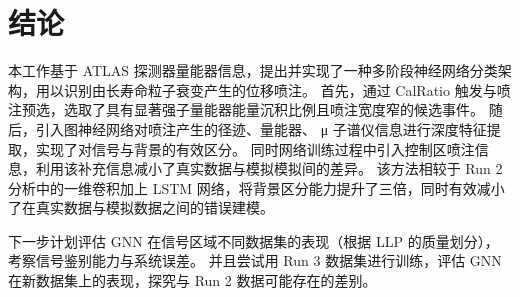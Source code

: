 
\chapter{结论}
本工作基于 ATLAS 探测器量能器信息，提出并实现了一种多阶段神经网络分类架构，用以识别由长寿命粒子衰变产生的位移喷注。
首先，通过 CalRatio 触发与喷注预选，选取了具有显著强子量能器能量沉积比例且喷注宽度窄的候选事件。
随后，引入图神经网络对喷注产生的径迹、量能器、 μ 子谱仪信息进行深度特征提取，实现了对信号与背景的有效区分。
同时网络训练过程中引入控制区喷注信息，利用该补充信息减小了真实数据与模拟模拟间的差异。
该方法相较于 Run 2 分析中的一维卷积加上 LSTM 网络，将背景区分能力提升了三倍，同时有效减小了在真实数据与模拟数据之间的错误建模。

下一步计划评估 GNN 在信号区域不同数据集的表现（根据 LLP 的质量划分），考察信号鉴别能力与系统误差。
并且尝试用 Run 3 数据集进行训练，评估 GNN 在新数据集上的表现，探究与 Run 2 数据可能存在的差别。

